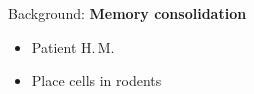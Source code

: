 \documentclass[aspectratio=34]{beamer}
\begin{document}
\begin{frame}{Background: \textbf{Memory consolidation}}
  \begin{block}{}
    \begin{itemize}
    \item Patient H.\,M.
    \item Place cells in rodents
      \end{itemize}
    \end{block}
    
\end{frame}
\end{document}
